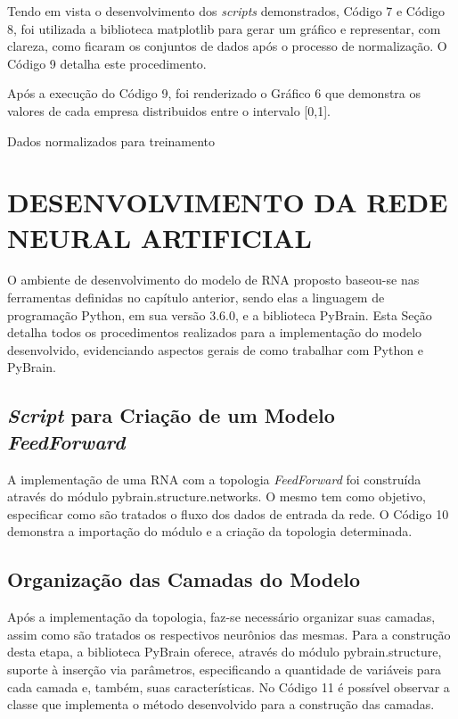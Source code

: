 Tendo em vista o desenvolvimento dos \textit{scripts} demonstrados, Código 7 e Código 8, foi utilizada a biblioteca matplotlib para gerar um gráfico e representar, com clareza, como ficaram os conjuntos de dados após o processo de normalização. O Código 9 detalha este procedimento.



Após a execução do Código 9, foi renderizado o Gráfico 6 que demonstra os valores de cada empresa distribuidos entre o intervalo [0,1].

\begin{grafico}[h]
	\centering
	\caption{Dados normalizados para treinamento}
	\label{lingua}
\end{grafico}

\section{DESENVOLVIMENTO DA REDE NEURAL ARTIFICIAL}
O ambiente de desenvolvimento do modelo de RNA proposto baseou-se nas ferramentas definidas no capítulo anterior, sendo elas a linguagem de programação Python, em sua versão 3.6.0, e a biblioteca PyBrain. Esta Seção detalha todos os procedimentos realizados para a implementação do modelo desenvolvido, evidenciando aspectos gerais de como trabalhar com Python e PyBrain.
\subsection{\textit{Script} para Criação de um Modelo \textit{FeedForward}}
A implementação de uma RNA com a topologia \textit{FeedForward} foi construída através do módulo pybrain.structure.networks. O mesmo tem como objetivo, especificar como são tratados o fluxo dos dados de entrada da rede. O Código 10 demonstra a importação do módulo e a criação da topologia determinada.



\subsection{Organização das Camadas do Modelo}
Após a implementação da topologia, faz-se necessário organizar suas camadas, assim como são tratados os respectivos neurônios das mesmas. Para a construção desta etapa, a biblioteca PyBrain oferece, através do módulo pybrain.structure, suporte à inserção via parâmetros, especificando a quantidade de variáveis para cada camada e, também, suas características. No Código 11 é possível observar a classe que implementa o método desenvolvido para a construção das camadas.

